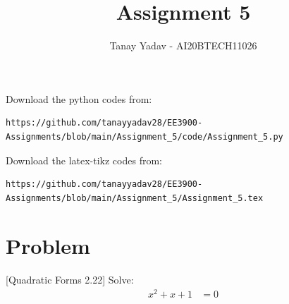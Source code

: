 \documentclass[journal,12pt,twocolumn]{IEEEtran}
\begin{document}
\let\vec\mathbf
\renewcommand{\thefigure}{\theproblem}
\def\putbox#1#2#3{\makebox[0in][l]{\makebox[#1][l]{}\raisebox{\baselineskip}[0in][0in]{\raisebox{#2}[0in][0in]{#3}}}}
     \def\rightbox#1{\makebox[0in][r]{#1}}
     \def\centbox#1{\makebox[0in]{#1}}
     \def\topbox#1{\raisebox{-\baselineskip}[0in][0in]{#1}}
     \def\midbox#1{\raisebox{-0.5\baselineskip}[0in][0in]{#1}}
\vspace{3cm}
\title{Assignment 5}
\author{Tanay Yadav - AI20BTECH11026}
\maketitle
\newpage
\bigskip
\renewcommand{\thefigure}{\theenumi}
\renewcommand{\thetable}{\theenumi}
Download the python codes from: 
%
\begin{lstlisting}
https://github.com/tanayyadav28/EE3900-Assignments/blob/main/Assignment_5/code/Assignment_5.py
\end{lstlisting}
Download the latex-tikz codes from: 
%
\begin{lstlisting}
https://github.com/tanayyadav28/EE3900-Assignments/blob/main/Assignment_5/Assignment_5.tex
\end{lstlisting}
\section{Problem}
[Quadratic Forms 2.22]
Solve:
\begin{align}
    x^2 + x + 1 &= 0
\end{align}
\end{document}
